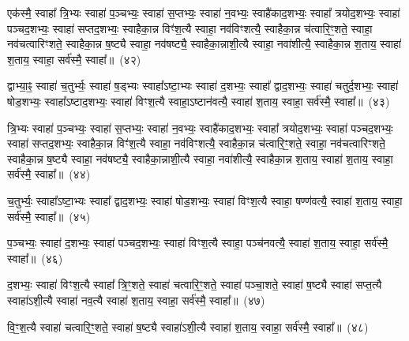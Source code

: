 एक॑स्मै॒ स्वाहा᳚ त्रि॒भ्यः स्वाहा॑ प॒ञ्चभ्यः॒ स्वाहा॑ स॒प्तभ्यः॒ स्वाहा॑ न॒वभ्यः॒ स्वाहै॑काद॒शभ्यः॒ स्वाहा᳚ त्रयोद॒शभ्यः॒ स्वाहा॑ पञ्चद॒शभ्यः॒ स्वाहा॑ सप्तद॒शभ्यः॒ स्वाहैका॒न्न विꣳ॑श॒त्यै स्वाहा॒ नव॑विꣳशत्यै॒ स्वाहैका॒न्न च॑त्वारि॒ꣳ॒शते॒ स्वाहा॒ नव॑चत्वारिꣳशते॒ स्वाहैका॒न्न ष॒ष्ट्यै स्वाहा॒ नव॑षष्ट्यै॒ स्वाहैका॒न्नाशी॒त्यै स्वाहा॒ नवा॑शीत्यै॒ स्वाहैका॒न्न श॒ताय॒ स्वाहा॑ श॒ताय॒ स्वाहा॒ सर्व॑स्मै॒ स्वाहा᳚॥~(४२)\ip

{\anuvakamend[{एक॑स्मै त्रि॒भ्यः प॑ञ्चा॒शत्}]}%

द्वाभ्या॒ꣴ॒ स्वाहा॑ च॒तुर्भ्यः॒ स्वाहा॑ ष॒ड्भ्यः स्वाहा᳚\-ऽष्टा॒भ्यः स्वाहा॑ द॒शभ्यः॒ स्वाहा᳚ द्वाद॒शभ्यः॒ स्वाहा॑ चतुर्द॒शभ्यः॒ स्वाहा॑ षोड॒शभ्यः॒ स्वाहा᳚\-ऽष्टाद॒शभ्यः॒ स्वाहा॑ विꣳश॒त्यै स्वाहा॒\-ऽष्टान॑वत्यै॒ स्वाहा॑ श॒ताय॒ स्वाहा॒ सर्व॑स्मै॒ स्वाहा᳚॥~(४३)\ip

{\anuvakamend[{द्वाभ्या॑म॒ष्टान॑वत्यै॒ षड्विꣳ॑शतिः}]}%

त्रि॒भ्यः स्वाहा॑ प॒ञ्चभ्यः॒ स्वाहा॑ स॒प्तभ्यः॒ स्वाहा॑ न॒वभ्यः॒ स्वाहै॑काद॒शभ्यः॒ स्वाहा᳚ त्रयोद॒शभ्यः॒ स्वाहा॑ पञ्चद॒शभ्यः॒ स्वाहा॑ सप्तद॒शभ्यः॒ स्वाहैका॒न्न विꣳ॑श॒त्यै स्वाहा॒ नव॑विꣳशत्यै॒ स्वाहैका॒न्न च॑त्वारि॒ꣳ॒शते॒ स्वाहा॒ नव॑चत्वारिꣳशते॒ स्वाहैका॒न्न ष॒ष्ट्यै स्वाहा॒ नव॑षष्ट्यै॒ स्वाहैका॒न्नाशी॒त्यै स्वाहा॒ नवा॑शीत्यै॒ स्वाहैका॒न्न श॒ताय॒ स्वाहा॑ श॒ताय॒ स्वाहा॒ सर्व॑स्मै॒ स्वाहा᳚॥~(४४)\ip

{\anuvakamend[{त्रि॒भ्यो᳚\-ऽष्टाचत्वारि॒ꣳ॒शत्}]}%

च॒तुर्भ्यः॒ स्वाहा᳚\-ऽष्टा॒भ्यः स्वाहा᳚ द्वाद॒शभ्यः॒ स्वाहा॑ षोड॒शभ्यः॒ स्वाहा॑ विꣳश॒त्यै स्वाहा॒ षण्ण॑वत्यै॒ स्वाहा॑ श॒ताय॒ स्वाहा॒ सर्व॑स्मै॒ स्वाहा᳚॥~(४५)\ip

{\anuvakamend[{च॒तुर्भ्यः॒ षण्ण॑वत्यै॒ षोड॑श}]}%

प॒ञ्चभ्यः॒ स्वाहा॑ द॒शभ्यः॒ स्वाहा॑ पञ्चद॒शभ्यः॒ स्वाहा॑ विꣳश॒त्यै स्वाहा॒ पञ्च॑नवत्यै॒ स्वाहा॑ श॒ताय॒ स्वाहा॒ सर्व॑स्मै॒ स्वाहा᳚॥~(४६)\ip

{\anuvakamend[{प॒ञ्चभ्यः॒ प़ञ्च॑नवत्यै॒ चतु॑र्दश}]}%

द॒शभ्यः॒ स्वाहा॑ विꣳश॒त्यै स्वाहा᳚ त्रि॒ꣳ॒शते॒ स्वाहा॑ चत्वारि॒ꣳ॒शते॒ स्वाहा॑ पञ्चा॒शते॒ स्वाहा॑ ष॒ष्ट्यै स्वाहा॑ सप्त॒त्यै स्वाहा॑\-ऽशी॒त्यै स्वाहा॑ नव॒त्यै स्वाहा॑ श॒ताय॒ स्वाहा॒ सर्व॑स्मै॒ स्वाहा᳚॥~(४७)\ip

{\anuvakamend[{द॒शभ्यो॒ द्वाविꣳ॑शतिः}]}%

वि॒ꣳ॒श॒त्यै स्वाहा॑ चत्वारि॒ꣳ॒शते॒ स्वाहा॑ ष॒ष्ट्यै स्वाहा॑\-ऽशी॒त्यै स्वाहा॑ श॒ताय॒ स्वाहा॒ सर्व॑स्मै॒ स्वाहा᳚॥~(४८)\ip

